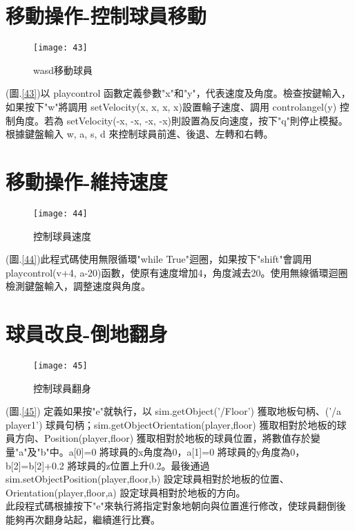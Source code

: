 \section{移動操作-控制球員移動}
\begin{figure}[hbt!]
\begin{center}
\texttt{[image: 43]}
\caption{\Large wasd移動球員}\label{fig.43}
\end{center}
\end{figure}
(圖.\ref{43})以 playcontrol 函數定義參數"x"和"y"，代表速度及角度。檢查按鍵輸入，如果按下"w"將調用 setVelocity(x, x, x, x)設置輪子速度、調用 controlangel(y) 控制角度。若為 setVelocity(-x, -x, -x, -x)則設置為反向速度，按下"q"則停止模擬。\\
  根據鍵盤輸入 w, a, s, d 來控制球員前進、後退、左轉和右轉。\\
\newpage
\section{移動操作-維持速度}
\begin{figure}[hbt!]
\begin{center}
\texttt{[image: 44]}
\caption{\Large 控制球員速度}\label{fig.44}
\end{center}
\end{figure}
(圖.\ref{44})此程式碼使用無限循環"while True"迴圈，如果按下"shift"會調用 playcontrol(v+4, a-20)函數，使原有速度增加4，角度減去20。使用無線循環迴圈檢測鍵盤輸入，調整速度與角度。\\
\section{球員改良-倒地翻身}
\begin{figure}[hbt!]
\begin{center}
\texttt{[image: 45]}
\caption{\Large 控制球員翻身}\label{fig.45}
\end{center}
\end{figure}
(圖.\ref{45}) 定義如果按"e"就執行，以 sim.getObject('/Floor') 獲取地板句柄、('/a player1') 球員句柄；sim.getObjectOrientation(player,floor) 獲取相對於地板的球員方向、Position(player,floor) 獲取相對於地板的球員位置，將數值存於變量"a"及"b"中。a[0]=0 將球員的x角度為0，a[1]=0 將球員的y角度為0，b[2]=b[2]+0.2 將球員的z位置上升0.2。最後通過 sim.setObjectPosition(player,floor,b) 設定球員相對於地板的位置、Orientation(player,floor,a) 設定球員相對於地板的方向。\\
  此段程式碼根據按下"e"來執行將指定對象地朝向與位置進行修改，使球員翻倒後能夠再次翻身站起，繼續進行比賽。\\
\renewcommand{\baselinestretch}{1} %